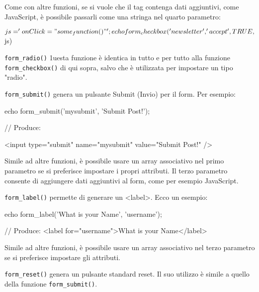 Come con altre funzioni, se si vuole che il tag contenga dati aggiuntivi, come JavaScript, è possibile passarli come una stringa nel quarto parametro:

\begin{code}
$js = 'onClick="some_function()"';

echo form_checkbox('newsletter', 'accept', TRUE, $js)
\end{code}

\verb|form_radio()| 1uesta funzione è identica in tutto e per tutto alla funzione \verb|form_checkbox()| di qui sopra, salvo che è utilizzata per impostare un tipo "radio".

\verb|form_submit()| genera un pulsante Submit (Invio) per il form. Per esempio:

\begin{code}
echo form_submit('mysubmit', 'Submit Post!');

// Produce:

<input type="submit" name="mysubmit" value="Submit Post!" />
\end{code}

Simile ad altre funzioni, è possibile usare un array associativo nel primo parametro se si preferisce impostare i propri attributi. Il terzo parametro consente di aggiungere dati aggiuntivi al form, come per esempio JavaScript.

\verb|form_label()| permette di generare un <label>. Ecco un esempio:

\begin{code}
echo form_label('What is your Name', 'username');

// Produce: 
<label for="username">What is your Name</label>
\end{code}

Simile ad altre funzioni, è possibile usare un array associativo nel terzo parametro se si preferisce impostare gli attributi.


\verb|form_reset()| genera un pulsante standard reset. Il suo utilizzo è simile a quello della funzione \verb|form_submit()|.

